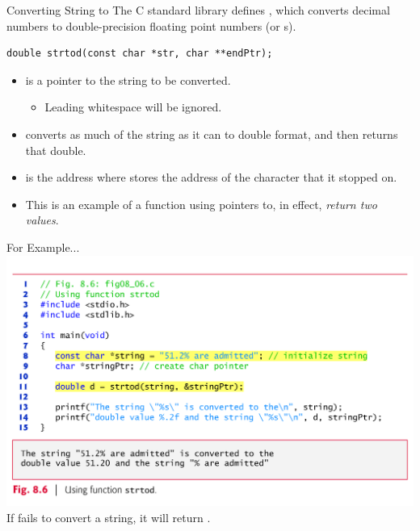\documentclass[11pt]{beamer}
\let\OldTexttt\texttt
\renewcommand{\texttt}[1]{\OldTexttt{\color{teal}{#1}}}
\begin{document}
\begin{frame}[fragile=singleslide]{Converting String to \texttt{double}}
The C standard library \texttt{stdlib.h} defines \texttt{strtod()}, which converts decimal numbers to double-precision floating point numbers (or \texttt{double}s).
\begin{lstlisting}[style=C]
double strtod(const char *str, char **endPtr);
\end{lstlisting}
\begin{itemize}
\item \texttt{str} is a pointer to the string to be converted.
\begin{itemize}
\item Leading whitespace will be ignored.
\end{itemize} 
\item \texttt{strtod} converts as much of the string as it can to double format, and then returns that double.  
\item \texttt{endPtr} is the address where \texttt{strtod} stores the address of the character that it stopped on.
\item This is an example of a function using pointers to, in effect, \emph{return two values}.  
\end{itemize}
\end{frame}

\begin{frame}{For Example...}
\center
\includegraphics[scale=0.12]{strtod.png}
If \texttt{strtod()} fails to convert a string, it will return \texttt{0}.
\end{frame}
\end{document}
